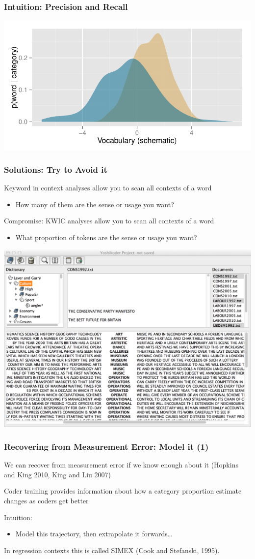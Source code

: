 \documentclass[11pt,compress,professionalfonts]{beamer}
\newcommand{\ita}{\begin{itemize}}
\newcommand{\itm}{\item[]}
\newcommand{\itz}{\end{itemize}}
\begin{document}
\begin{frame}[t]\frametitle{Intuition: Precision and Recall}

\centerline{\includegraphics[scale=1.7]{pictures/schematic-vocab}}

\end{frame}
\begin{frame}[t]\frametitle{Solutions: Try to Avoid it}

Keyword in context analyses allow you to scan all contexts of a word
\ita
\itm How many of them are the sense or usage you want?
\itz

Compromise: KWIC analyses allow you to scan all contexts of a word
\ita
\itm What proportion of tokens are the sense or usage you want?
\itz

\newpage

\centerline{\includegraphics[scale=.7]{pictures/yk-measurement-error}}

\end{frame}
\begin{frame}[t]\frametitle{Recovering from Measurement Error: Model it (1)}

We can recover from measurement error if we know enough about it (Hopkins and King 2010, King and Liu 2007)

Coder training provides information about how a category proportion estimate changes as coders get better

Intuition:
\ita
\itm Model this trajectory, then extrapolate it forwards\ldots
\itz

In regression contexts this is called SIMEX (Cook and Stefanski, 1995).

\end{frame}
\end{document}
